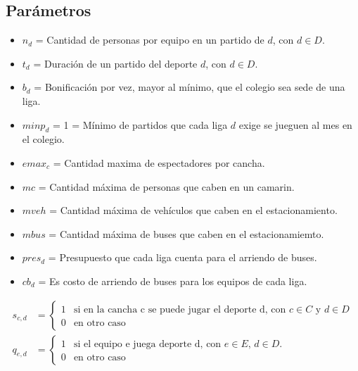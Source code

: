 \subsection{Parámetros}
\begin{itemize}
    
    \item $n_{d}$ = Cantidad de personas por equipo en un partido de $d$, con $d\in D$.
    
    \item $t_{d}$ = Duración de un partido del deporte $d$, con $d\in D$.

    
    
    \item $b_{d}$ = Bonificación por vez, mayor al mínimo, que el colegio sea sede de una liga.
    
    \item $minp_d$ = 1 = Mínimo de partidos que cada liga $d$ exige se jueguen al mes en el colegio.
        
    \item $emax_{c}$ = Cantidad maxima de espectadores por cancha.
    
    \item $mc$ = Cantidad máxima de personas que caben en un camarin.
    
    \item $mveh$ = Cantidad máxima de vehículos que caben en el estacionamiento.
    
    \item $mbus$ = Cantidad máxima de buses que caben en el estacionamiemto.
    
    \item $pres_{d}$ = Presupuesto que cada liga cuenta para el arriendo de buses.
    
    \item $cb_{d}$ = Es costo de arriendo de buses para los equipos de cada liga.
    
    
\end{itemize}


\begin{align*}
s_{c,d} &= \begin{cases} 
      1 & \text{si en la cancha c se puede jugar el deporte d, con $c\in C$ y $d\in D$} \\
      0 & \text{en otro caso} 
   \end{cases}\\
q_{e,d} &= \begin{cases} 
      1 & \text{si el equipo e juega deporte d, con $e\in E$, $d\in D$.} \\
      0 & \text{en otro caso} 
   \end{cases}\\  
\end{align*}

